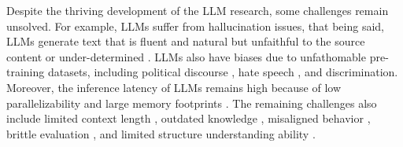 \documentclass[11pt]{article}
\begin{document}
%

Despite the thriving development of the LLM research, some challenges remain unsolved. For example, LLMs suffer from hallucination issues, that being said, LLMs generate text that is fluent and natural but unfaithful to the source content or under-determined \cite{kaddour2023challenges}. LLMs also have biases due to unfathomable pre-training datasets, including political discourse \cite{feng2023pretraining}, hate speech \cite{huang2023survey}, and discrimination. Moreover, the inference latency of LLMs remains high because of low parallelizability and large memory footprints \cite{pope2023efficiently}. The remaining challenges also include limited context length \cite{kaddour2023challenges}, outdated knowledge \cite{yao2023editing}, misaligned behavior \cite{russell2021human}, brittle evaluation \cite{zhao2021calibrate}, and limited structure understanding ability \cite{chen2023exploring}.



\end{document}
